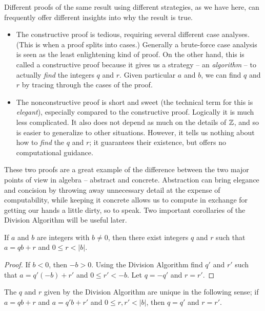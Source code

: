 Different proofs of the same result using different strategies, as we have here, can frequently offer different insights into why the result is true.
\begin{itemize}
\item The constructive proof is tedious, requiring several different case analyses.
(This is when a proof splits into cases.)
Generally a brute-force case analysis is seen as the least enlightening kind of proof.
On the other hand, this is called a constructive proof because it gives us a strategy -- an \emph{algorithm} -- to actually \emph{find} the integers \(q\) and \(r\).
Given particular \(a\) and \(b\), we can find \(q\) and \(r\) by tracing through the cases of the proof.
\item The nonconstructive proof is short and sweet (the technical term for this is \emph{elegant}), especially compared to the constructive proof.
Logically it is much less complicated.
It also does not depend as much on the details of \(\mathbb{Z}\), and so is easier to generalize to other situations.
However, it tells us nothing about how to \emph{find} the \(q\) and \(r\); it guarantees their existence, but offers no computational guidance.
\end{itemize}

These two proofs are a great example of the difference between the two major points of view in algebra -- abstract and concrete.
Abstraction can bring elegance and concision by throwing away unnecessary detail at the expense of computability, while keeping it concrete allows us to compute in exchange for getting our hands a little dirty, so to speak.
Two important corollaries of the Division Algorithm will be useful later.

\begin{cor}
If \(a\) and \(b\) are integers with \(b \neq 0\), then there exist integers \(q\) and \(r\) such that \(a = qb + r\) and \(0 \leq r < |b|\).
\end{cor}

\begin{proof}
If \(b < 0\), then \(-b > 0\).
Using the Division Algorithm find \(q'\) and \(r'\) such that \(a = q'(-b) + r'\) and \(0 \leq r' < -b\).
Let \(q = -q'\) and \(r = r'\).
\end{proof}

\begin{cor}\label{cor:div-alg-unique}
The \(q\) and \(r\) given by the Division Algorithm are unique in the following sense; if \(a = qb + r\) and \(a = q'b + r'\) and \(0 \leq r,r' < |b|\), then \(q = q'\) and \(r = r'\).
\end{cor}

